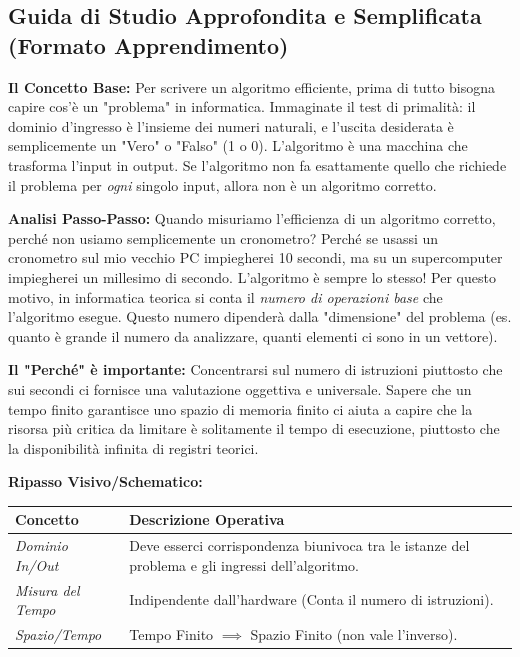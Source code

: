 \documentclass[a4paper, 11pt]{report}
\begin{document}
\vspace{0.5cm}
\subsection*{Guida di Studio Approfondita e Semplificata (Formato Apprendimento)}
\textbf{Il Concetto Base:}
Per scrivere un algoritmo efficiente, prima di tutto bisogna capire cos'è un "problema" in informatica. Immaginate il test di primalità: il dominio d'ingresso è l'insieme dei numeri naturali, e l'uscita desiderata è semplicemente un "Vero" o "Falso" (1 o 0). L'algoritmo è una macchina che trasforma l'input in output. Se l'algoritmo non fa esattamente quello che richiede il problema per \textit{ogni} singolo input, allora non è un algoritmo corretto.

\textbf{Analisi Passo-Passo:}
Quando misuriamo l'efficienza di un algoritmo corretto, perché non usiamo semplicemente un cronometro? Perché se usassi un cronometro sul mio vecchio PC impiegherei 10 secondi, ma su un supercomputer impiegherei un millesimo di secondo. L'algoritmo è sempre lo stesso! Per questo motivo, in informatica teorica si conta il \textit{numero di operazioni base} che l'algoritmo esegue. Questo numero dipenderà dalla "dimensione" del problema (es. quanto è grande il numero da analizzare, quanti elementi ci sono in un vettore).

\textbf{Il "Perché" è importante:}
Concentrarsi sul numero di istruzioni piuttosto che sui secondi ci fornisce una valutazione oggettiva e universale. Sapere che un tempo finito garantisce uno spazio di memoria finito ci aiuta a capire che la risorsa più critica da limitare è solitamente il tempo di esecuzione, piuttosto che la disponibilità infinita di registri teorici.

\textbf{Ripasso Visivo/Schematico:}
\begin{center}
\begin{tabular}{|l|p{10cm}|}
\hline
\textbf{Concetto} & \textbf{Descrizione Operativa} \\
\hline
\textit{Dominio In/Out} & Deve esserci corrispondenza biunivoca tra le istanze del problema e gli ingressi dell'algoritmo. \\
\hline
\textit{Misura del Tempo} & Indipendente dall'hardware (Conta il numero di istruzioni). \\
\hline
\textit{Spazio/Tempo} & Tempo Finito $\implies$ Spazio Finito (non vale l'inverso). \\
\hline
\end{tabular}
\end{center}
\end{document}
